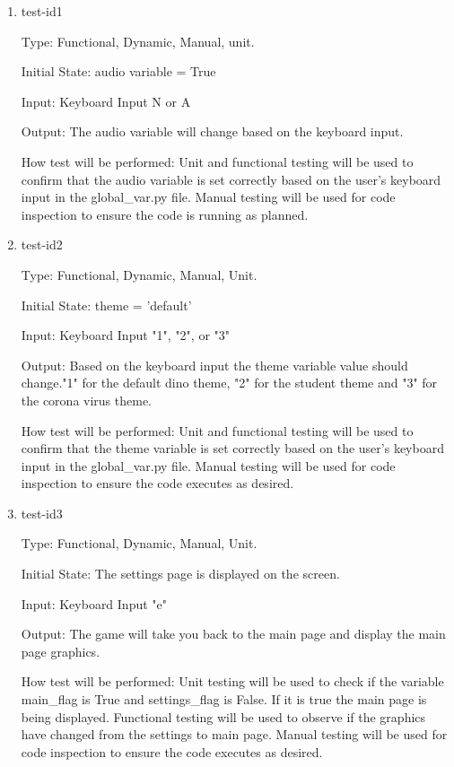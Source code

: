 \documentclass[12pt, titlepage]{article}
\begin{document}
\begin{enumerate}
	
	\item{test-id1\\}
	
	Type: Functional, Dynamic, Manual, unit.
	
	Initial State: audio variable = True
	
	Input: Keyboard Input N or A 
	
	Output: The audio variable will change based on the keyboard input. 
	
	How test will be performed: Unit and functional testing will be used to confirm that the audio variable is set correctly based on the user's keyboard input in the global\_var.py file. Manual testing will be used for code inspection to ensure the code is running as planned. 
	
	\item{test-id2\\}
	
	Type: Functional, Dynamic, Manual, Unit.
	
	Initial State: theme = 'default'
	
	Input: Keyboard Input "1", "2", or "3"
	
	Output: Based on the keyboard input the theme variable value should change."1" for the default dino theme, "2" for the student theme and "3" for the corona virus theme.
	
	How test will be performed: Unit and functional testing will be used to confirm that the theme variable is set correctly based on the user's keyboard input in the global\_var.py file. Manual testing will be used for code inspection to ensure the code executes as desired. 
	
	\item{test-id3\\}
	
	Type: Functional, Dynamic, Manual, Unit.
	
	Initial State: The settings page is displayed on the screen. 
	
	Input: Keyboard Input "e"
	
	Output: The game will take you back to the main page and display the main page graphics. 
	
	How test will be performed: Unit testing will be used to check if the variable main\_flag is True and settings\_flag is False. If it is true the main page is being displayed. Functional testing will be used to observe if the graphics have changed from the settings to main page. Manual testing will be used for code inspection to ensure the code executes as desired. 
	
\end{enumerate}
\end{document}
